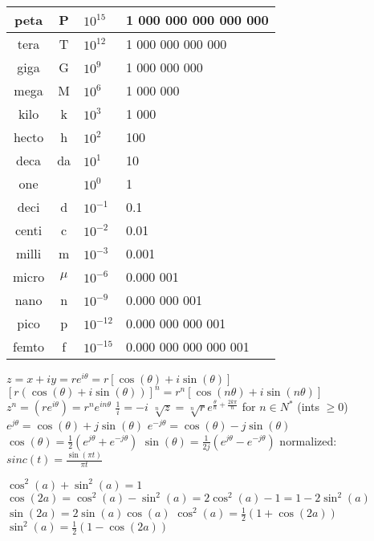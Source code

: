\documentclass[12pt]{article}
\begin{document}
\begin{multicols*}{2}
\begin{flushleft}
\begin{outline}[longenum]
 \\
\begin{tabular}{|c c l l|}                                   \hline
peta  & P     & $10^{ 15}$ & \hfill 1 000 000 000 000 000 \\ \hline
tera  & T     & $10^{ 12}$ & \hfill     1 000 000 000 000 \\ \hline
giga  & G     & $10^{  9}$ & \hfill         1 000 000 000 \\ \hline
mega  & M     & $10^{  6}$ & \hfill             1 000 000 \\ \hline
kilo  & k     & $10^{  3}$ & \hfill                 1 000 \\ \hline
hecto & h     & $10^{  2}$ & \hfill                   100 \\ \hline
deca  & da    & $10^{  1}$ & \hfill                    10 \\ \hline
one   &       & $10^{ 0 }$ & \hfill       1 \hfill \hfill \\ \hline
deci  & d     & $10^{- 1}$ & 0.1                          \\ \hline
centi & c     & $10^{- 2}$ & 0.01                         \\ \hline
milli & m     & $10^{- 3}$ & 0.001                        \\ \hline
micro & $\mu$ & $10^{- 6}$ & 0.000 001                    \\ \hline
nano  & n     & $10^{- 9}$ & 0.000 000 001                \\ \hline
pico  & p     & $10^{-12}$ & 0.000 000 000 001            \\ \hline
femto & f     & $10^{-15}$ & 0.000 000 000 000 001        \\ \hline
\end{tabular}


  \1 $z = x+iy = re^{i\theta} = r[\cos(\theta)+i\sin(\theta)]$
  \1 $[r(\cos(\theta)+i\sin(\theta))]^n = r^n[\cos(n\theta)+i\sin(n\theta)]$
  \1 $z^n = (re^{i\theta}) = r^ne^{in\theta}$
  \1 $\frac{1}{i}=-i$
  \1 $\sqrt[n]{z} = \sqrt[n]{r}e^{\frac{\theta}{n}+\frac{2k\pi}{n}}$ for $n\in N^*$ (ints $\geq0$)
  \1 $e^{j\theta} = \cos(\theta) + j\sin(\theta)$
  \1 $e^{-j\theta} = \cos(\theta) - j\sin(\theta)$
  \1 $\cos(\theta) = \frac{1}{2}(e^{j\theta} + e^{-j\theta})$
  \1 $\sin(\theta) = \frac{1}{2j}(e^{j\theta} - e^{-j\theta})$
  \1 normalized: $sinc(t) = \frac{\sin(\pi t)}{\pi t}$

  \1 $\cos^2(a)+\sin^2(a)=1$
  \1 $\cos(2a)=\cos^2(a) - \sin^2(a) = 2\cos^2(a)-1 = 1-2\sin^2(a)$
  \1 $\sin(2a) = 2\sin(a)\cos(a)$
  \1 $\cos^2(a) = \frac{1}{2}(1 + \cos(2a))$
  \1 $\sin^2(a) = \frac{1}{2}(1 - \cos(2a))$



\end{outline}
\end{flushleft}
\end{multicols*}
\end{document}
